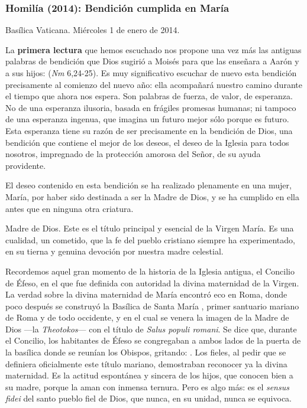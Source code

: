 {\subsubsection{Homilía (2014): Bendición cumplida en María}

Basílica Vaticana. Miércoles 1 de enero de 2014.

La \textbf{primera lectura} que hemos escuchado nos propone una vez más las antiguas palabras de bendición que Dios sugirió a Moisés para que las enseñara a Aarón y a sus hijos:  (\emph{Nm} 6,24-25). Es muy significativo escuchar de nuevo esta bendición precisamente al comienzo del nuevo año: ella acompañará nuestro camino durante el tiempo que ahora nos espera. Son palabras de fuerza, de valor, de esperanza. No de una esperanza ilusoria, basada en frágiles promesas humanas; ni tampoco de una esperanza ingenua, que imagina un futuro mejor sólo porque es futuro. Esta esperanza tiene su razón de ser precisamente en la bendición de Dios, una bendición que contiene el mejor de los deseos, el deseo de la Iglesia para todos nosotros, impregnado de la protección amorosa del Señor, de su ayuda providente.

El deseo contenido en esta bendición se ha realizado plenamente en una mujer, María, por haber sido destinada a ser la Madre de Dios, y se ha cumplido en ella antes que en ninguna otra criatura.

Madre de Dios. Este es el título principal y esencial de la Virgen María. Es una cualidad, un cometido, que la fe del pueblo cristiano siempre ha experimentado, en su tierna y genuina devoción por nuestra madre celestial.

Recordemos aquel gran momento de la historia de la Iglesia antigua, el Concilio de Éfeso, en el que fue definida con autoridad la divina maternidad de la Virgen. La verdad sobre la divina maternidad de María encontró eco en Roma, donde poco después se construyó la Basílica de Santa María , primer santuario mariano de Roma y de todo occidente, y en el cual se venera la imagen de la Madre de Dios ---la \emph{Theotokos}--- con el título de \emph{Salus populi romani}. Se dice que, durante el Concilio, los habitantes de Éfeso se congregaban a ambos lados de la puerta de la basílica donde se reunían los Obispos, gritando: . Los fieles, al pedir que se definiera oficialmente este título mariano, demostraban reconocer ya la divina maternidad. Es la actitud espontánea y sincera de los hijos, que conocen bien a su madre, porque la aman con inmensa ternura. Pero es algo más: es el \emph{sensus fidei} del santo pueblo fiel de Dios, que nunca, en su unidad, nunca se equivoca.

}
